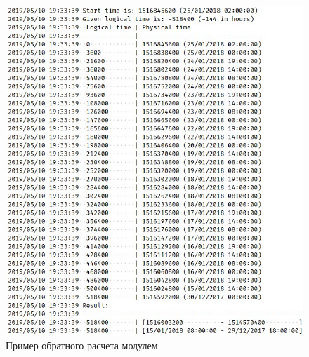 \begin{figure}[ht!]
	\centering
	\includegraphics[scale=0.6]{pics/scheduleRevertEvalExample.png}
	\caption{Пример обратного расчета модулем}
	\label{fig:revEval}
\end{figure}

